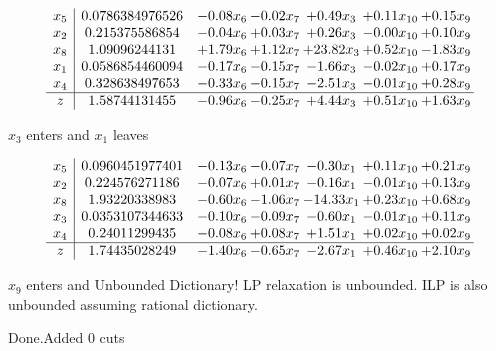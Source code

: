 \documentclass[8pt]{article}
\begin{document}
 \[\begin{array}{c| c c@{\hskip 2pt} c@{\hskip 2pt} c@{\hskip 2pt} c@{\hskip 2pt} c@{\hskip 2pt} }
 x_{5}   &  0.0786384976526 & -0.08 x_{6} & -0.02 x_{7} & +  0.49 x_{3} & +  0.11 x_{10} & +  0.15 x_{9}\\
 x_{2}   &  0.215375586854 & -0.04 x_{6} & +  0.03 x_{7} & +  0.26 x_{3} & -0.00 x_{10} & +  0.10 x_{9}\\
 x_{8}   &  1.09096244131 & +  1.79 x_{6} & +  1.12 x_{7} & + 23.82 x_{3} & +  0.52 x_{10} & -1.83 x_{9}\\
 x_{1}   &  0.0586854460094 & -0.17 x_{6} & -0.15 x_{7} & -1.66 x_{3} & -0.02 x_{10} & +  0.17 x_{9}\\
 x_{4}   &  0.328638497653 & -0.33 x_{6} & -0.15 x_{7} & -2.51 x_{3} & -0.01 x_{10} & +  0.28 x_{9}\\
\hline
z    &  1.58744131455 & -0.96 x_{6} & -0.25 x_{7} & +  4.44 x_{3} & +  0.51 x_{10} & +  1.63 x_{9}\\
\end{array}\]


 $ x_{3} $ enters and $ x_{1} $ leaves 

 \[\begin{array}{c| c c@{\hskip 2pt} c@{\hskip 2pt} c@{\hskip 2pt} c@{\hskip 2pt} c@{\hskip 2pt} }
 x_{5}   &  0.0960451977401 & -0.13 x_{6} & -0.07 x_{7} & -0.30 x_{1} & +  0.11 x_{10} & +  0.21 x_{9}\\
 x_{2}   &  0.224576271186 & -0.07 x_{6} & +  0.01 x_{7} & -0.16 x_{1} & -0.01 x_{10} & +  0.13 x_{9}\\
 x_{8}   &  1.93220338983 & -0.60 x_{6} & -1.06 x_{7} & -14.33 x_{1} & +  0.23 x_{10} & +  0.68 x_{9}\\
 x_{3}   &  0.0353107344633 & -0.10 x_{6} & -0.09 x_{7} & -0.60 x_{1} & -0.01 x_{10} & +  0.11 x_{9}\\
 x_{4}   &  0.24011299435 & -0.08 x_{6} & +  0.08 x_{7} & +  1.51 x_{1} & +  0.02 x_{10} & +  0.02 x_{9}\\
\hline
z    &  1.74435028249 & -1.40 x_{6} & -0.65 x_{7} & -2.67 x_{1} & +  0.46 x_{10} & +  2.10 x_{9}\\
\end{array}\]


 $ x_{9} $ enters and Unbounded Dictionary!
 LP relaxation is unbounded. ILP is also unbounded assuming rational dictionary. 

Done.Added 0 cuts 
\end{document}
